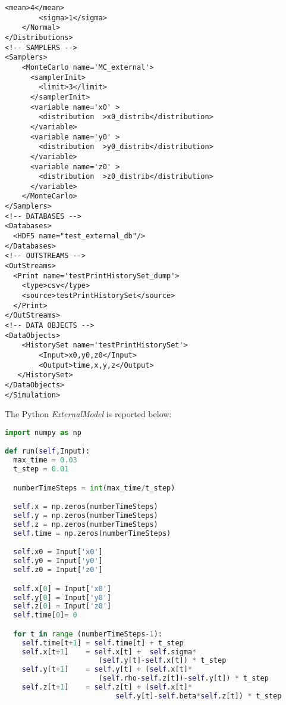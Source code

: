 \begin{lstlisting}[style=XML,morekeywords={debug,re,seeding,class,subType,limit}]
        <mean>4</mean>
        <sigma>1</sigma>
    </Normal>
</Distributions>
<!-- SAMPLERS -->
<Samplers>
    <MonteCarlo name='MC_external'>
      <samplerInit>
        <limit>3</limit>
      </samplerInit>
      <variable name='x0' >
        <distribution  >x0_distrib</distribution>
      </variable>
      <variable name='y0' >
        <distribution  >y0_distrib</distribution>
      </variable>
      <variable name='z0' >
        <distribution  >z0_distrib</distribution>
      </variable>
    </MonteCarlo>
</Samplers>
<!-- DATABASES -->
<Databases>
  <HDF5 name="test_external_db"/>
</Databases>
<!-- OUTSTREAMS -->
<OutStreams>
  <Print name='testPrintHistorySet_dump'>
    <type>csv</type>
    <source>testPrintHistorySet</source>
  </Print>
</OutStreams>
<!-- DATA OBJECTS -->
<DataObjects>
    <HistorySet name='testPrintHistorySet'>
        <Input>x0,y0,z0</Input>
        <Output>time,x,y,z</Output>
   </HistorySet>
</DataObjects>
</Simulation>
\end{lstlisting}
The Python \textit{ExternalModel} is reported below:
\begin{lstlisting}[language=python]
import numpy as np

def run(self,Input):
  max_time = 0.03
  t_step = 0.01

  numberTimeSteps = int(max_time/t_step)

  self.x = np.zeros(numberTimeSteps)
  self.y = np.zeros(numberTimeSteps)
  self.z = np.zeros(numberTimeSteps)
  self.time = np.zeros(numberTimeSteps)

  self.x0 = Input['x0']
  self.y0 = Input['y0']
  self.z0 = Input['z0']

  self.x[0] = Input['x0']
  self.y[0] = Input['y0']
  self.z[0] = Input['z0']
  self.time[0]= 0

  for t in range (numberTimeSteps-1):
    self.time[t+1] = self.time[t] + t_step
    self.x[t+1]    = self.x[t] +  self.sigma*
                      (self.y[t]-self.x[t]) * t_step
    self.y[t+1]    = self.y[t] + (self.x[t]*
                      (self.rho-self.z[t])-self.y[t]) * t_step
    self.z[t+1]    = self.z[t] + (self.x[t]*
                          self.y[t]-self.beta*self.z[t]) * t_step
\end{lstlisting}
